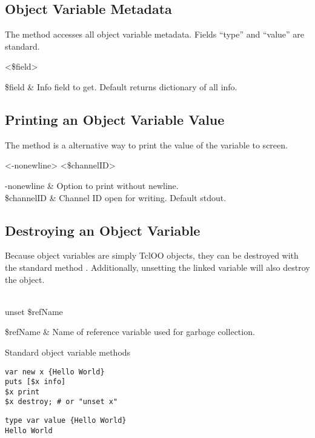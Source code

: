 \documentclass{article}
\begin{document}
\clearpage
\subsection{Object Variable Metadata}
The method  accesses all object variable metadata. 
Fields ``type'' and ``value'' are standard.
\begin{syntax}
 <\$field>
\end{syntax}
\begin{args}
\$field & Info field to get. Default returns dictionary of all info. \\
\end{args}

\subsection{Printing an Object Variable Value}
The method  is a alternative way to print the value of the variable to screen.
\begin{syntax}
 <-nonewline> <\$channelID>
\end{syntax}
\begin{args}
-nonewline & Option to print without newline. \\
\$channelID & Channel ID open for writing. Default stdout.
\end{args}

\subsection{Destroying an Object Variable}
Because object variables are simply TclOO objects, they can be destroyed with the standard method . 
Additionally, unsetting the linked variable will also destroy the object.
\begin{syntax}
 \\
unset \$refName
\end{syntax}
\begin{args}
\$refName & Name of reference variable used for garbage collection.
\end{args}

\begin{example}{Standard object variable methods}
\begin{lstlisting}
var new x {Hello World}
puts [$x info]
$x print
$x destroy; # or "unset x"
\end{lstlisting}
\tcblower
\begin{lstlisting}
type var value {Hello World}
Hello World
\end{lstlisting}
\end{example}
\end{document}
